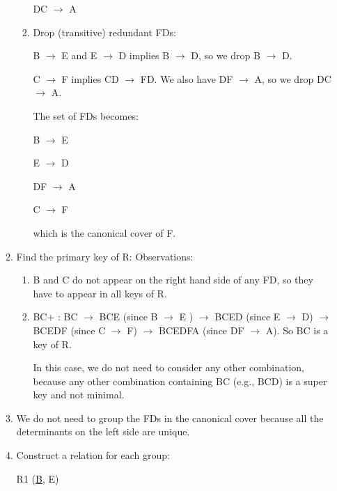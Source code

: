 \begin{enumerate}
\begin{enumerate}
\begin{enumerate}
				\hspace{0.5 in} DC $\rightarrow$ A
				
				\item Drop (transitive) redundant FDs:
				
				B $\rightarrow$ E and E $\rightarrow$ D implies B $\rightarrow$ D, so we drop B $\rightarrow$ D.
				
				C $\rightarrow$ F implies CD $\rightarrow$ FD. We also have DF $\rightarrow$ A, so we drop DC $\rightarrow$ A.
				
				The set of FDs becomes:
				
                \hspace{0.5 in} B $\rightarrow$ E

                \hspace{0.5 in} E $\rightarrow$ D			

				\hspace{0.5 in} DF $\rightarrow$ A			

			 	\hspace{0.5 in} C $\rightarrow$ F			
				
				which is the canonical cover of F.
            \end{enumerate}
        \item Find the primary key of R:
            Observations:
                \begin{enumerate}
                    \item B and C do not appear on the right hand side of any FD, so they have to appear in all keys of R.
                    \item BC+ : BC $\rightarrow$ BCE (since B $\rightarrow$ E ) $\rightarrow$ BCED (since E $\rightarrow$ D) $\rightarrow$  BCEDF (since C $\rightarrow$ F) $\rightarrow$ BCEDFA (since DF $\rightarrow$ A). So BC is a key of R.
                    
                    In this case, we do not need to consider any other combination, because any other combination containing BC (e.g., BCD) is a super key and not minimal.
                \end{enumerate}
        \item We do not need to group the FDs in the canonical cover because all the determinants on the left side are unique.
        \item Construct a relation for each group:
        
                \hspace{0.75 in} R1 (\underline{B}, E)
                

\end{enumerate}
\end{enumerate}
